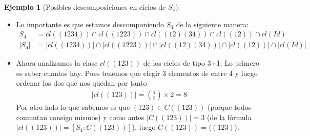 \documentclass{book}
\theoremstyle{definition}
\newtheorem{ej}{Ejemplo}
\theoremstyle{remark}
\begin{document}
\begin{ej}[Posibles descomposiciones en cíclos de $S_4$]
\begin{itemize}
		\item Lo importante es que estamos descomponiendo $S_4$ de la siguiente manera:
		\begin{align*}
			S_4 &= cl((1234)) \cap cl((1223)) \cap cl((12)(34)) \cap cl((12)) \cap cl(Id) \\
			|S_4| &= |cl((1234))| \cap |cl((1223))| \cap |cl((12)(34))| \cap |cl((12))| \cap |cl(Id)|
		\end{align*}
		\item Ahora analizamos la clase $cl((123))$ de los ciclos de tipo 3+1. Lo primero es saber cuantos hay. Pues tenemos que elegir 3 elementos de entre 4 y luego ordenar los dos que nos quedan por tanto
		\begin{align*}
			|cl((123))| = \binom{4}{3} \times 2 = 8
		\end{align*}
		Por otro lado lo que sabemos es que $(123) \in C((123))$ (porque todos conmutan consigo mismos) y como antes $|C((123))| = 3$ (de la fórmula $|cl((123))| = [S_4:C((123))]$), luego $C((123)) = \langle (123) \rangle$.
		

\end{itemize}
\end{ej}
\end{document}
